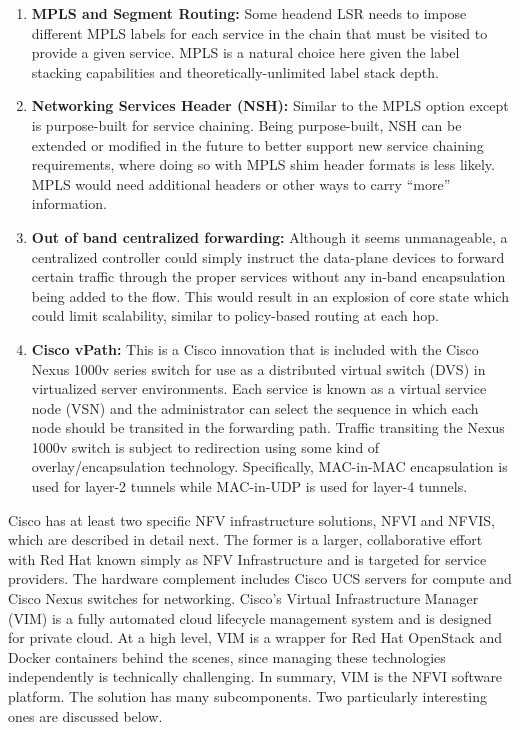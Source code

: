 \begin{enumerate}
  \item \textbf{MPLS and Segment Routing:} Some headend LSR needs to impose different
  MPLS labels for each service in the chain that must be visited to provide a
  given service. MPLS is a natural choice here given the label stacking
  capabilities and theoretically-unlimited label stack depth.
  \item \textbf{Networking Services Header (NSH):} Similar to the MPLS option except
  is purpose-built for service chaining. Being purpose-built, NSH can be extended
  or modified in the future to better support new service chaining requirements,
  where doing so with MPLS shim header formats is less likely. MPLS would need
  additional headers or other ways to carry ``more'' information.
  \item \textbf{Out of band centralized forwarding:} Although it seems unmanageable,
  a centralized controller could simply instruct the data-plane devices to forward
  certain traffic through the proper services without any in-band encapsulation
  being added to the flow. This would result in an explosion of core state which
  could limit scalability, similar to policy-based routing at each hop.
  \item \textbf{Cisco vPath:} This is a Cisco innovation that is included with the
  Cisco Nexus 1000v series switch for use as a distributed virtual switch (DVS)
  in virtualized server environments. Each service is known as a virtual service
  node (VSN) and the administrator can select the sequence in which each node
  should be transited in the forwarding path. Traffic transiting the Nexus 1000v
  switch is subject to redirection using some kind of overlay/encapsulation
  technology. Specifically, MAC-in-MAC encapsulation is used for layer-2 tunnels
  while MAC-in-UDP is used for layer-4 tunnels.
\end{enumerate}

Cisco has at least two specific NFV infrastructure solutions, NFVI and NFVIS,
which are described in detail next. The former is a larger, collaborative
effort with Red Hat known simply as NFV Infrastructure and is targeted for
service providers. The hardware complement includes Cisco UCS servers for
compute and Cisco Nexus switches for networking. Cisco's Virtual
Infrastructure Manager (VIM) is a fully automated cloud lifecycle management
system and is designed for private cloud. At a high level, VIM is a wrapper
for Red Hat OpenStack and Docker containers behind the scenes, since managing
these technologies independently is technically challenging. In summary, VIM
is the NFVI software platform. The solution has many subcomponents. Two
particularly interesting ones are discussed below.

